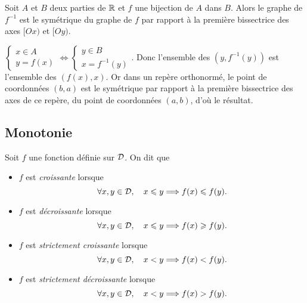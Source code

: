 \documentclass{magnolia}
\begin{document}
\begin{proposition}
Soit $A$ et $B$ deux parties de $\mathbb{R}$ et $f$ une bijection de $A$ dans
$B$. Alors le graphe de $f^{-1}$ est le symétrique du graphe de $f$ par
rapport à la première bissectrice des axes $[Ox)$ et $[Oy)$.
\end{proposition}
\begin{preuve}
$\begin{cases}x\in A\\ y=f(x)\end{cases}\Longleftrightarrow \begin{cases}y\in B\\ x=f^{-1}(y)\end{cases}$.
Donc l'ensemble des $(y,f^{-1}(y))$ est l'ensemble des $(f(x),x)$.
Or dans un repère orthonormé, le point de coordonnées $(b,a)$ est le symétrique par rapport à la première bissectrice des axes de ce repère, du point de coordonnées $(a,b)$, d'où le résultat.
\end{preuve}

\subsection{Monotonie}

\begin{definition}[utile=-3]
  Soit $f$ une fonction définie sur $\mathcal{D}$. On dit que
  \begin{itemize}
  \item $f$ est \emph{croissante} lorsque
    $$\forall x,y\in\mathcal{D} ,\quad x\leqslant y \Longrightarrow f(x)\leqslant f(y).$$
  \item $f$ est \emph{décroissante} lorsque
    $$\forall x,y\in\mathcal{D} ,\quad x\leqslant y \Longrightarrow f(x)\geqslant f(y).$$
  \item $f$ est \emph{strictement croissante} lorsque
    $$\forall x,y\in\mathcal{D} ,\quad x< y \Longrightarrow f(x)< f(y).$$
  \item $f$ est \emph{strictement décroissante} lorsque
    $$\forall x,y\in\mathcal{D} ,\quad x< y \Longrightarrow f(x)> f(y).$$
  \end{itemize}
\end{definition}
\end{document}
